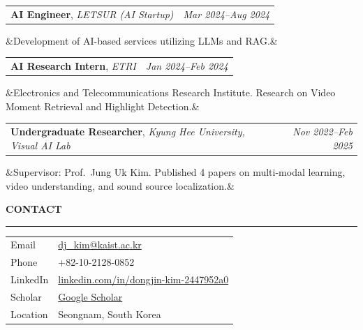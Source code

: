 \documentclass[11pt,letterpaper]{article}
\makeatletter
\newcommand{\cvsection}[1]{%
  \vspace{10pt}%
  {\large\sffamily\textbf{\MakeUppercase{#1}}}%
  \vspace{2pt}\hrule height 0.5pt\vspace{6pt}%
}
\newcommand{\cventry}[4]{%
  \begin{tabular*}{\textwidth}{@{}l@{\extracolsep{\fill}}r@{}}
    \textbf{#2}, \textit{#3} & \textit{\small #1}
  \end{tabular*}%
  \ifx&#4&\else
    \vspace{1pt}\\
    \hspace{0pt}{\small #4}%
  \fi
  \vspace{4pt}
}
\makeatother
\begin{document}
\cventry{Mar 2024--Aug 2024}%
  {AI Engineer}%
  {LETSUR (AI Startup)}%
  {Development of AI-based services utilizing LLMs and RAG.}

\cventry{Jan 2024--Feb 2024}%
  {AI Research Intern}%
  {ETRI}%
  {Electronics and Telecommunications Research Institute. Research on Video Moment Retrieval and Highlight Detection.}

\cventry{Nov 2022--Feb 2025}%
  {Undergraduate Researcher}%
  {Kyung Hee University, Visual AI Lab}%
  {Supervisor: Prof.\ Jung Uk Kim. Published 4 papers on multi-modal learning, video understanding, and sound source localization.}

\cvsection{Contact}

\begin{tabular}{@{}ll}
  Email    & \href{mailto:dj_kim@kaist.ac.kr}{dj\_kim@kaist.ac.kr} \\[2pt]
  Phone    & +82-10-2128-0852 \\[2pt]
  LinkedIn & \href{https://www.linkedin.com/in/dongjin-kim-2447952a0/}{linkedin.com/in/dongjin-kim-2447952a0} \\[2pt]
  Scholar  & \href{https://scholar.google.co.kr/citations?user=icG_qkUAAAAJ&hl=en}{Google Scholar} \\[2pt]
  Location & Seongnam, South Korea \\
\end{tabular}
\end{document}
